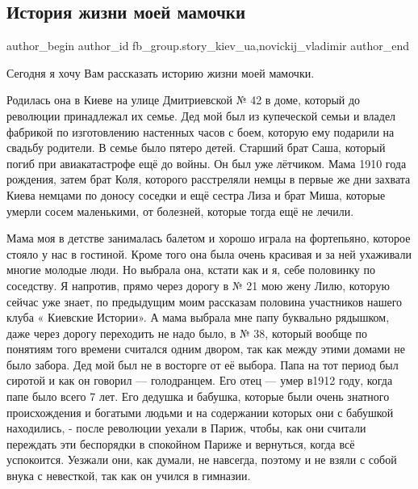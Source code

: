 
 
 
 
 
 
\subsection{История жизни моей мамочки}
\label{sec:18_01_2022.fb.fb_group.story_kiev_ua.1.mamochka}
 
\ifcmt
 author_begin
   author_id fb_group.story_kiev_ua,novickij_vladimir
 author_end
\fi

Сегодня я хочу Вам рассказать историю жизни моей мамочки.     

Родилась она в Киеве на улице Дмитриевской № 42 в доме, который до революции
принадлежал их семье. Дед мой был из купеческой семьи и владел фабрикой по
изготовлению настенных часов с боем, которую ему подарили на свадьбу родители.
В семье было пятеро детей. Старший брат Саша, который погиб при авиакатастрофе
ещё до войны. Он был уже лётчиком.  Мама 1910 года рождения, затем брат Коля,
которого расстреляли немцы в первые же дни захвата Киева немцами по доносу
соседки и ещё сестра Лиза и брат Миша, которые умерли сосем маленькими, от
болезней, которые тогда ещё не лечили. 

Мама моя в детстве занималась балетом и
хорошо играла на фортепьяно, которое стояло у нас в гостиной. Кроме того она
была очень красивая и за ней ухаживали многие молодые люди. Но выбрала она,
кстати  как и я,  себе половинку по соседству. Я напротив, прямо через
дорогу в № 21 мою жену Лилю, которую сейчас  уже знает, по предыдущим моим
рассказам   половина участников нашего клуба « Киевские Истории».  А мама
выбрала мне папу буквально  рядышком, даже через дорогу переходить не надо
было, в № 38, который вообще по понятиям того времени считался одним двором,
так как между этими домами не было забора. Дед мой был не в восторге от её
выбора. Папа на тот период был сиротой и как он говорил — голодранцем. Его
отец — умер в1912 году, когда папе было всего 7 лет. Его дедушка и бабушка,
которые были очень знатного происхождения и богатыми людьми и на содержании
которых они с бабушкой находились, - после революции уехали в Париж, чтобы,
как они считали  переждать эти беспорядки в спокойном Париже и вернуться,
когда всё успокоится. Уезжали они, как думали, не навсегда, поэтому и не
взяли с собой внука с невесткой, так как он учился в гимназии. 

